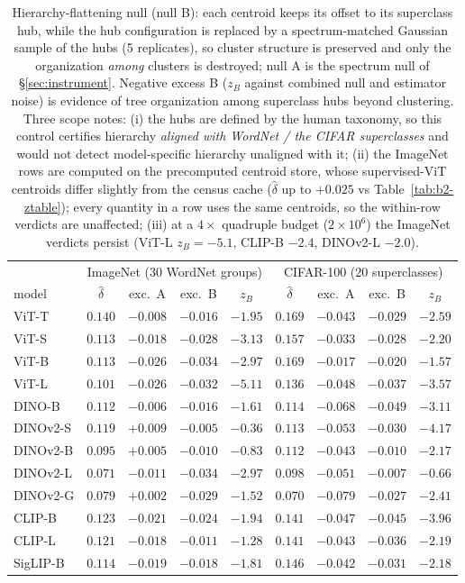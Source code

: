 \begin{table}[H]
\centering
\small
\setlength{\tabcolsep}{4pt}
\begin{tabular}{lcccc|cccc}
\toprule
& \multicolumn{4}{c|}{ImageNet (30 WordNet groups)} & \multicolumn{4}{c}{CIFAR-100 (20 superclasses)} \\
model & $\hat\delta$ & exc.\ A & exc.\ B & $z_B$ & $\hat\delta$ & exc.\ A & exc.\ B & $z_B$ \\
\midrule
ViT-T & $0.140$ & $-0.008$ & $-0.016$ & $-1.95$ & $0.169$ & $-0.043$ & $-0.029$ & $-2.59$ \\
ViT-S & $0.113$ & $-0.018$ & $-0.028$ & $-3.13$ & $0.157$ & $-0.033$ & $-0.028$ & $-2.20$ \\
ViT-B & $0.113$ & $-0.026$ & $-0.034$ & $-2.97$ & $0.169$ & $-0.017$ & $-0.020$ & $-1.57$ \\
ViT-L & $0.101$ & $-0.026$ & $-0.032$ & $-5.11$ & $0.136$ & $-0.048$ & $-0.037$ & $-3.57$ \\
\midrule
DINO-B & $0.112$ & $-0.006$ & $-0.016$ & $-1.61$ & $0.114$ & $-0.068$ & $-0.049$ & $-3.11$ \\
DINOv2-S & $0.119$ & $+0.009$ & $-0.005$ & $-0.36$ & $0.113$ & $-0.053$ & $-0.030$ & $-4.17$ \\
DINOv2-B & $0.095$ & $+0.005$ & $-0.010$ & $-0.83$ & $0.112$ & $-0.043$ & $-0.010$ & $-2.17$ \\
DINOv2-L & $0.071$ & $-0.011$ & $-0.034$ & $-2.97$ & $0.098$ & $-0.051$ & $-0.007$ & $-0.66$ \\
DINOv2-G & $0.079$ & $+0.002$ & $-0.029$ & $-1.52$ & $0.070$ & $-0.079$ & $-0.027$ & $-2.41$ \\
\midrule
CLIP-B & $0.123$ & $-0.021$ & $-0.024$ & $-1.94$ & $0.141$ & $-0.047$ & $-0.045$ & $-3.96$ \\
CLIP-L & $0.121$ & $-0.018$ & $-0.011$ & $-1.28$ & $0.141$ & $-0.043$ & $-0.036$ & $-2.19$ \\
SigLIP-B & $0.114$ & $-0.019$ & $-0.018$ & $-1.81$ & $0.146$ & $-0.042$ & $-0.031$ & $-2.18$ \\
\bottomrule
\end{tabular}
\caption{Hierarchy-flattening null (null B): each centroid keeps its offset to its superclass hub, while the hub configuration is replaced by a spectrum-matched Gaussian sample of the hubs (5 replicates), so cluster structure is preserved and only the organization \emph{among} clusters is destroyed; null A is the spectrum null of \S\ref{sec:instrument}. Negative excess B ($z_B$ against combined null and estimator noise) is evidence of tree organization among superclass hubs beyond clustering. Three scope notes: (i) the hubs are defined by the human taxonomy, so this control certifies hierarchy \emph{aligned with WordNet / the CIFAR superclasses} and would not detect model-specific hierarchy unaligned with it; (ii) the ImageNet rows are computed on the precomputed centroid store, whose supervised-ViT centroids differ slightly from the census cache ($\hat\delta$ up to $+0.025$ vs Table~\ref{tab:b2-ztable}); every quantity in a row uses the same centroids, so the within-row verdicts are unaffected; (iii) at a $4\times$ quadruple budget ($2{\times}10^6$) the ImageNet verdicts persist (ViT-L $z_B{=}-5.1$, CLIP-B $-2.4$, DINOv2-L $-2.0$).}
\label{tab:b13-flatnull}
\end{table}
